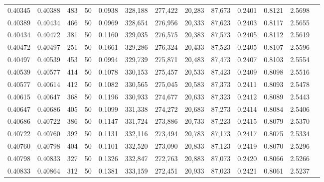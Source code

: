 \begin{tabular}{rrrrrrrrrrrrr}
0.40345 & 0.40388 &   483 &  50 &                                     0.0938 & 328,188 & 277,422 &  20,283 &  87,673 & 0.2401 & 0.8121 & 2.5698 \\
0.40389 & 0.40434 &   466 &  50 &                                     0.0969 & 328,654 & 276,956 &  20,333 &  87,623 & 0.2403 & 0.8117 & 2.5655 \\
0.40434 & 0.40472 &   381 &  50 &                                     0.1160 & 329,035 & 276,575 &  20,383 &  87,573 & 0.2405 & 0.8112 & 2.5619 \\
0.40472 & 0.40497 &   251 &  50 &                                     0.1661 & 329,286 & 276,324 &  20,433 &  87,523 & 0.2405 & 0.8107 & 2.5596 \\
0.40497 & 0.40539 &   453 &  50 &                                     0.0994 & 329,739 & 275,871 &  20,483 &  87,473 & 0.2407 & 0.8103 & 2.5554 \\
0.40539 & 0.40577 &   414 &  50 &                                     0.1078 & 330,153 & 275,457 &  20,533 &  87,423 & 0.2409 & 0.8098 & 2.5516 \\
0.40577 & 0.40614 &   412 &  50 &                                     0.1082 & 330,565 & 275,045 &  20,583 &  87,373 & 0.2411 & 0.8093 & 2.5478 \\
0.40615 & 0.40647 &   368 &  50 &                                     0.1196 & 330,933 & 274,677 &  20,633 &  87,323 & 0.2412 & 0.8089 & 2.5443 \\
0.40647 & 0.40686 &   405 &  50 &                                     0.1099 & 331,338 & 274,272 &  20,683 &  87,273 & 0.2414 & 0.8084 & 2.5406 \\
0.40686 & 0.40722 &   386 &  50 &                                     0.1147 & 331,724 & 273,886 &  20,733 &  87,223 & 0.2415 & 0.8079 & 2.5370 \\
0.40722 & 0.40760 &   392 &  50 &                                     0.1131 & 332,116 & 273,494 &  20,783 &  87,173 & 0.2417 & 0.8075 & 2.5334 \\
0.40760 & 0.40798 &   404 &  50 &                                     0.1101 & 332,520 & 273,090 &  20,833 &  87,123 & 0.2419 & 0.8070 & 2.5296 \\
0.40798 & 0.40833 &   327 &  50 &                                     0.1326 & 332,847 & 272,763 &  20,883 &  87,073 & 0.2420 & 0.8066 & 2.5266 \\
0.40833 & 0.40864 &   312 &  50 &                                     0.1381 & 333,159 & 272,451 &  20,933 &  87,023 & 0.2421 & 0.8061 & 2.5237 \\

\end{tabular}
